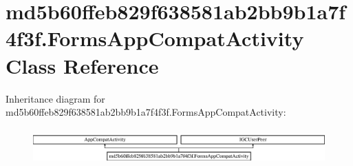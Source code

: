 \hypertarget{classmd5b60ffeb829f638581ab2bb9b1a7f4f3f_1_1FormsAppCompatActivity}{}\section{md5b60ffeb829f638581ab2bb9b1a7f4f3f.\+Forms\+App\+Compat\+Activity Class Reference}
\label{classmd5b60ffeb829f638581ab2bb9b1a7f4f3f_1_1FormsAppCompatActivity}
Inheritance diagram for md5b60ffeb829f638581ab2bb9b1a7f4f3f.\+Forms\+App\+Compat\+Activity\+:\begin{figure}[H]
\begin{center}
\leavevmode
\includegraphics[height=1.417722cm]{classmd5b60ffeb829f638581ab2bb9b1a7f4f3f_1_1FormsAppCompatActivity}
\end{center}
\end{figure}
